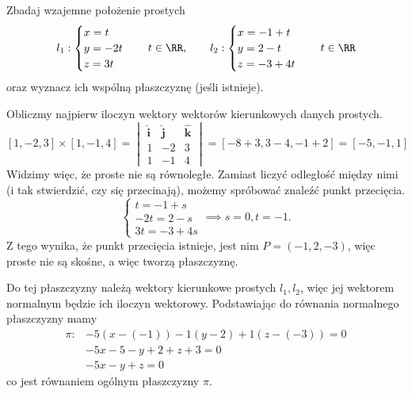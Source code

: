 \begin{example}
    Zbadaj wzajemne położenie prostych
    \[ l_1 : \begin{cases}
        x = t \\
        y = -2t \\
        z = 3t
    \end{cases} \quad t \in \RR, \qquad
    l_2 : \begin{cases}
        x = -1 + t \\
        y = 2 - t \\
        z = -3 + 4t
    \end{cases} \quad t \in \RR \]
    oraz wyznacz ich wspólną płaszczyznę (jeśli istnieje).
\end{example}
\begin{solution}
    Obliczmy najpierw iloczyn wektory wektorów kierunkowych danych prostych.
    \[ [1, -2, 3] \times [1, -1, 4] = \begin{vmatrix}
        \mathbf{\hat{i}} & \mathbf{\hat{j}} & \mathbf{\hat{k}} \\
        1 & -2 & 3 \\
        1 & -1 & 4
    \end{vmatrix} = [-8 + 3, 3 - 4, -1 + 2] = [-5, -1, 1] \]
    Widzimy więc, że proste nie są równoległe. Zamiast liczyć odległość między nimi (i tak stwierdzić, czy się przecinają), możemy spróbować znaleźć punkt przecięcia.
    \[ \begin{cases}
        t = -1 + s \\
        -2t = 2 - s \\
        3t = -3 + 4s
    \end{cases} \implies s = 0, t = -1. \]
    Z tego wynika, że punkt przecięcia istnieje, jest nim $P = (-1, 2, -3)$, więc proste nie są skośne, a więc tworzą płaszczyznę.

    Do tej płaszczyzny należą wektory kierunkowe prostych $l_1, l_2$, więc jej wektorem normalnym będzie ich iloczyn wektorowy. Podstawiając do równania normalnego płaszczyzny mamy
    \begin{align*}
        \pi :& -5(x - (-1)) -1(y - 2) + 1(z - (-3)) = 0 \\
             & -5x - 5 - y + 2 + z + 3 = 0 \\
             & -5x - y + z = 0
    \end{align*}
    co jest równaniem ogólnym płaszczyzny $\pi$.
\end{solution}

